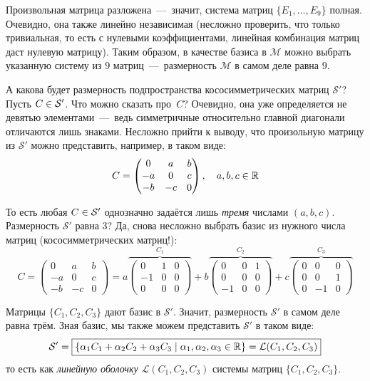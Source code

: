\documentclass[a4paper,12pt]{article}
\newcommand{\Coso}{\mathcal S'}
\begin{document}
  Произвольная матрица разложена~---~значит, система матриц $\{E_1, \ldots, E_9\}$ полная.
  Очевидно, она также линейно независимая (несложно проверить, что только тривиальная, то есть с нулевыми коэффициентами, линейная комбинация матриц даст нулевую матрицу).
  Таким образом, в качестве базиса в $\mathcal M$ можно выбрать указанную систему из $9$ матриц~---~размерность $\mathcal M$ в самом деле равна $9$.
  
  А какова будет размерность подпространства кососимметрических матриц $\Coso$?
  Пусть $C \hm\in \Coso$.
  Что можно сказать про~$C$?
  Очевидно, она уже определяется не девятью элементами~---~ведь симметричные относительно главной диагонали отличаются лишь знаками.
  Несложно прийти к выводу, что произольную матрицу из $\Coso$ можно представить, например, в таком виде:
  \[
    C = \begin{pmatrix}
       0 &  a & b\\
      -a &  0 & c\\
      -b & -c & 0
    \end{pmatrix}, \quad a, b, c \in \operatorname{\mathbb R}
  \]
  
  То есть любая $C \hm\in \Coso$ однозначно задаётся лишь \emph{тремя} числами $(a, b, c)$.
  Размерность $\Coso$ равна $3$?
  Да, снова несложно выбрать базис из нужного числа матриц (кососимметрических матриц!):
  \[
    C = \begin{pmatrix}
       0 &  a & b\\
      -a &  0 & c\\
      -b & -c & 0
    \end{pmatrix}
    = a \overbrace{\begin{pmatrix}
       0 &  1 & 0\\
      -1 &  0 & 0\\
       0 &  0 & 0
    \end{pmatrix}}^{C_1}
    + b \overbrace{\begin{pmatrix}
       0 &  0 & 1\\
       0 &  0 & 0\\
      -1 &  0 & 0
    \end{pmatrix}}^{C_2}
    + c \overbrace{\begin{pmatrix}
       0 &  0 & 0\\
       0 &  0 & 1\\
       0 & -1 & 0
    \end{pmatrix}}^{C_3}
  \]
  
  Матрицы $\{C_1, C_2, C_3\}$ дают базис в $\Coso$.
  Значит, размерность $\Coso$ в самом деле равна трём.
  Зная базис, мы также можем представить $\Coso$ в таком виде:
  \[
    \Coso = \boxed{\{\alpha_1 C_1 + \alpha_2 C_2 + \alpha_3 C_3 \mid \alpha_1, \alpha_2, \alpha_3 \in \RR\} = \mathcal L(C_1, C_2, C_3)}
  \]
  то есть как \emph{линейную оболочку} $\mathcal L(C_1, C_2, C_3)$ системы матриц $\{C_1, C_2, C_3\}$.
  
\end{document}
